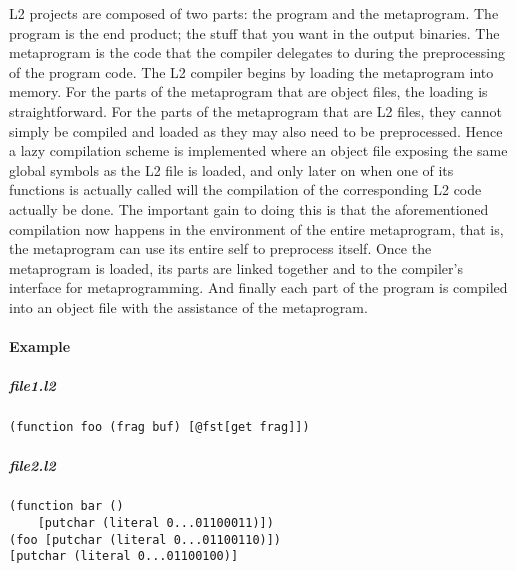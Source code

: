 \documentclass[]{article}
\let\oldparagraph\paragraph
\renewcommand{\paragraph}[1]{\oldparagraph{#1}\mbox{}}
\let\oldsubparagraph\subparagraph
\renewcommand{\subparagraph}[1]{\oldsubparagraph{#1}\mbox{}}
\begin{document}
L2 projects are composed of two parts: the program and the metaprogram.
The program is the end product; the stuff that you want in the output
binaries. The metaprogram is the code that the compiler delegates to
during the preprocessing of the program code. The L2 compiler begins by
loading the metaprogram into memory. For the parts of the metaprogram
that are object files, the loading is straightforward. For the parts of
the metaprogram that are L2 files, they cannot simply be compiled and
loaded as they may also need to be preprocessed. Hence a lazy
compilation scheme is implemented where an object file exposing the same
global symbols as the L2 file is loaded, and only later on when one of
its functions is actually called will the compilation of the
corresponding L2 code actually be done. The important gain to doing this
is that the aforementioned compilation now happens in the environment of
the entire metaprogram, that is, the metaprogram can use its entire self
to preprocess itself. Once the metaprogram is loaded, its parts are
linked together and to the compiler's interface for metaprogramming. And
finally each part of the program is compiled into an object file with
the assistance of the metaprogram.

\hypertarget{example}{%
\paragraph{Example}\label{example}}

\hypertarget{file1.l2}{%
\subparagraph{file1.l2}\label{file1.l2}}

\begin{verbatim}
(function foo (frag buf) [@fst[get frag]])

\end{verbatim}

\hypertarget{file2.l2}{%
\subparagraph{file2.l2}\label{file2.l2}}

\begin{verbatim}
(function bar ()
    [putchar (literal 0...01100011)])
(foo [putchar (literal 0...01100110)])
[putchar (literal 0...01100100)]
\end{verbatim}
\end{document}
